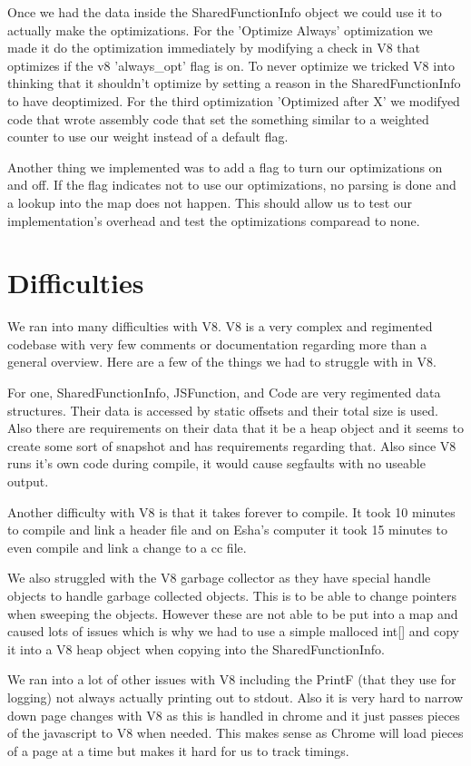 \documentclass[twocolumn,showpacs,%
  nofootinbib,aps,superscriptaddress,%
  eqsecnum,prd,notitlepage,showkeys,10pt]{revtex4-1}
\begin{document}
Once we had the data inside the SharedFunctionInfo object we could use it to actually make the optimizations. For the 'Optimize Always' optimization we made it do the optimization immediately by modifying a check in V8 that optimizes if the v8 'always\_opt' flag is on. To never optimize we tricked V8 into thinking that it shouldn't optimize by setting a reason in the SharedFunctionInfo to have deoptimized. For the third optimization 'Optimized after X' we modifyed code that wrote assembly code that set the something similar to a weighted counter to use our weight instead of a default flag.

Another thing we implemented was to add a flag to turn our optimizations on and off. If the flag indicates not to use our optimizations, no parsing is done and a lookup into the map does not happen. This should allow us to test our implementation's overhead and test the optimizations comparead to none.

\section {Difficulties}
We ran into many difficulties with V8. V8 is a very complex and regimented codebase with very few comments or documentation regarding more than a general overview. Here are a few of the things we had to struggle with in V8.

For one, SharedFunctionInfo, JSFunction, and Code are very regimented data structures. Their data is  accessed by static offsets and their total size is used. Also there are requirements on their data that it be a heap object and it seems to create some sort of snapshot and has requirements regarding that. Also since V8 runs it's own code during compile, it would cause segfaults with no useable output.

Another difficulty with V8 is that it takes forever to compile. It took 10 minutes to compile and link a header file and on Esha's computer it took 15 minutes to even compile and link a change to a cc file.

We also struggled with the V8 garbage collector as they have special handle objects to handle garbage collected objects. This is to be able to change pointers when sweeping the objects. However these are not able to be put into a map and caused lots of issues which is why we had to use a simple malloced int[] and copy it into a V8 heap object when copying into the SharedFunctionInfo. 

We ran into a lot of other issues with V8 including the PrintF (that they use for logging) not always actually printing out to stdout. Also it is very hard to narrow down page changes with V8 as this is handled in chrome and it just passes pieces of the javascript to V8 when needed. This makes sense as Chrome will load pieces of a page at a time but makes it hard for us to track timings.
\end{document}
